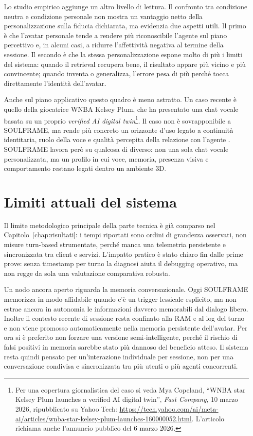 Lo studio empirico aggiunge un altro livello di lettura. Il confronto tra condizione neutra e condizione personale non mostra un vantaggio netto della personalizzazione sulla fiducia dichiarata, ma evidenzia due aspetti utili. Il primo è che l'avatar personale tende a rendere più riconoscibile l'agente sul piano percettivo e, in alcuni casi, a ridurre l'affettività negativa al termine della sessione. Il secondo è che la stessa personalizzazione espone molto di più i limiti del sistema: quando il retrieval recupera bene, il risultato appare più vicino e più convincente; quando inventa o generalizza, l'errore pesa di più perché tocca direttamente l'identità dell'avatar.

Anche sul piano applicativo questo quadro è meno astratto. Un caso recente è quello della giocatrice WNBA Kelsey Plum, che ha presentato una chat vocale basata su un proprio \emph{verified AI digital twin}\footnote{Per una copertura giornalistica del caso si veda Mya Copeland, ``WNBA star Kelsey Plum launches a verified AI digital twin'', \emph{Fast Company}, 10 marzo 2026, ripubblicato su Yahoo Tech: \url{https://tech.yahoo.com/ai/meta-ai/articles/wnba-star-kelsey-plum-launches-160000052.html}. L'articolo richiama anche l'annuncio pubblico del 6 marzo 2026.}. Il caso non è sovrapponibile a SOULFRAME, ma rende più concreto un orizzonte d'uso legato a continuità identitaria, ruolo della voce e qualità percepita della relazione con l'agente \cite{Kan2023ECA_Training,Yang2025ECA_XR,seaborn2021voiceux}. SOULFRAME lavora però su qualcosa di diverso: non una sola chat vocale personalizzata, ma un profilo in cui voce, memoria, presenza visiva e comportamento restano legati dentro un ambiente 3D.

\section{Limiti attuali del sistema}
\label{sec:limiti}

Il limite metodologico principale della parte tecnica è già comparso nel Capitolo~\ref{chap:risultati}: i tempi riportati sono ordini di grandezza osservati, non misure turn-based strumentate, perché manca una telemetria persistente e sincronizzata tra client e servizi. L'impatto pratico è stato chiaro fin dalle prime prove: senza timestamp per turno la diagnosi aiuta il debugging operativo, ma non regge da sola una valutazione comparativa robusta.

Un nodo ancora aperto riguarda la memoria conversazionale. Oggi SOULFRAME memorizza in modo affidabile quando c'è un trigger lessicale esplicito, ma non estrae ancora in autonomia le informazioni davvero memorabili dal dialogo libero. Inoltre il contesto recente di sessione resta confinato alla RAM e al log del turno e non viene promosso automaticamente nella memoria persistente dell'avatar. Per ora si è preferito non forzare una versione semi-intelligente, perché il rischio di falsi positivi in memoria sarebbe stato più dannoso del beneficio atteso. Il sistema resta quindi pensato per un'interazione individuale per sessione, non per una conversazione condivisa e sincronizzata tra più utenti o più agenti concorrenti.

